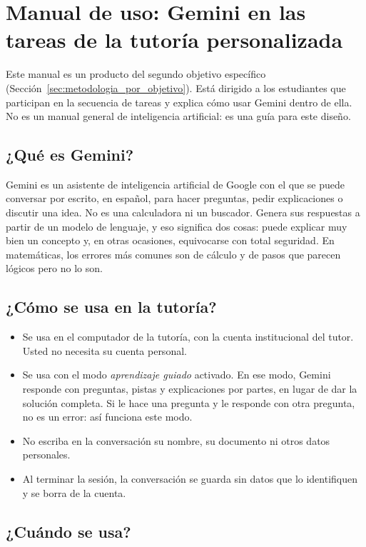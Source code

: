 \chapter{Manual de uso: Gemini en las tareas de la tutoría personalizada}
\label{anexo:manual_ia}

Este manual es un producto del segundo objetivo específico (Sección~\ref{sec:metodologia_por_objetivo}). Está dirigido a los estudiantes que participan en la secuencia de tareas y explica cómo usar Gemini dentro de ella. No es un manual general de inteligencia artificial: es una guía para este diseño.

\section*{¿Qué es Gemini?}

Gemini es un asistente de inteligencia artificial de Google con el que se puede conversar por escrito, en español, para hacer preguntas, pedir explicaciones o discutir una idea. No es una calculadora ni un buscador. Genera sus respuestas a partir de un modelo de lenguaje, y eso significa dos cosas: puede explicar muy bien un concepto y, en otras ocasiones, equivocarse con total seguridad. En matemáticas, los errores más comunes son de cálculo y de pasos que parecen lógicos pero no lo son.

\section*{¿Cómo se usa en la tutoría?}

\begin{itemize}
\item Se usa en el computador de la tutoría, con la cuenta institucional del tutor. Usted no necesita su cuenta personal.
\item Se usa con el modo \emph{aprendizaje guiado} activado. En ese modo, Gemini responde con preguntas, pistas y explicaciones por partes, en lugar de dar la solución completa. Si le hace una pregunta y le responde con otra pregunta, no es un error: así funciona este modo.
\item No escriba en la conversación su nombre, su documento ni otros datos personales.
\item Al terminar la sesión, la conversación se guarda sin datos que lo identifiquen y se borra de la cuenta.
\end{itemize}

\section*{¿Cuándo se usa?}

